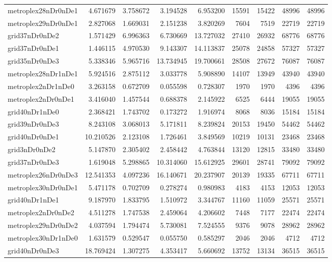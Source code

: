 \begin{longtable}{|l|r|r|r|r|r|r|r|r|}
metroplex28nDr0nDe1 & 4.671679 & 3.758672 & 3.194528 & 6.953200 & 15591 & 15422 & 48996 & 48996 \\
metroplex29nDr0nDe1 & 2.827068 & 1.669031 & 2.151238 & 3.820269 & 7604 & 7519 & 22719 & 22719 \\
grid37nDr0nDe2 & 1.571429 & 6.996363 & 6.730669 & 13.727032 & 27410 & 26932 & 68776 & 68776 \\
grid37nDr0nDe1 & 1.446115 & 4.970530 & 9.143307 & 14.113837 & 25078 & 24858 & 57327 & 57327 \\
grid35nDr0nDe3 & 5.338346 & 5.965716 & 13.734945 & 19.700661 & 28508 & 27672 & 76087 & 76087 \\
metroplex28nDr1nDe1 & 5.924516 & 2.875112 & 3.033778 & 5.908890 & 14107 & 13949 & 43940 & 43940 \\
metroplex2nDr1nDe0 & 3.263158 & 0.672709 & 0.055598 & 0.728307 & 1970 & 1970 & 4396 & 4396 \\
metroplex2nDr0nDe1 & 3.416040 & 1.457544 & 0.688378 & 2.145922 & 6525 & 6444 & 19055 & 19055 \\
grid40nDr1nDe0 & 2.368421 & 1.743702 & 0.173272 & 1.916974 & 8068 & 8036 & 15184 & 15184 \\
grid39nDr0nDe3 & 8.243108 & 3.068013 & 5.171811 & 8.239824 & 20153 & 19450 & 54462 & 54462 \\
grid40nDr0nDe1 & 10.210526 & 2.123108 & 1.726461 & 3.849569 & 10219 & 10131 & 23468 & 23468 \\
grid3nDr0nDe2 & 5.147870 & 2.305402 & 2.458442 & 4.763844 & 13120 & 12815 & 33480 & 33480 \\
grid37nDr0nDe3 & 1.619048 & 5.298865 & 10.314060 & 15.612925 & 29601 & 28741 & 79092 & 79092 \\
metroplex26nDr0nDe3 & 12.541353 & 4.097236 & 16.140671 & 20.237907 & 20139 & 19335 & 67711 & 67711 \\
metroplex30nDr0nDe1 & 5.471178 & 0.702709 & 0.278274 & 0.980983 & 4183 & 4153 & 12053 & 12053 \\
grid40nDr1nDe1 & 9.187970 & 1.833795 & 1.510972 & 3.344767 & 11160 & 11059 & 25571 & 25571 \\
metroplex2nDr0nDe2 & 4.511278 & 1.747538 & 2.459064 & 4.206602 & 7448 & 7177 & 22474 & 22474 \\
metroplex29nDr0nDe2 & 4.037594 & 1.794474 & 5.730081 & 7.524555 & 9376 & 9078 & 28962 & 28962 \\
metroplex30nDr1nDe0 & 1.631579 & 0.529547 & 0.055750 & 0.585297 & 2046 & 2046 & 4712 & 4712 \\
grid40nDr0nDe3 & 18.769424 & 1.307275 & 4.353417 & 5.660692 & 13752 & 13134 & 36515 & 36515 \\

\end{longtable}
